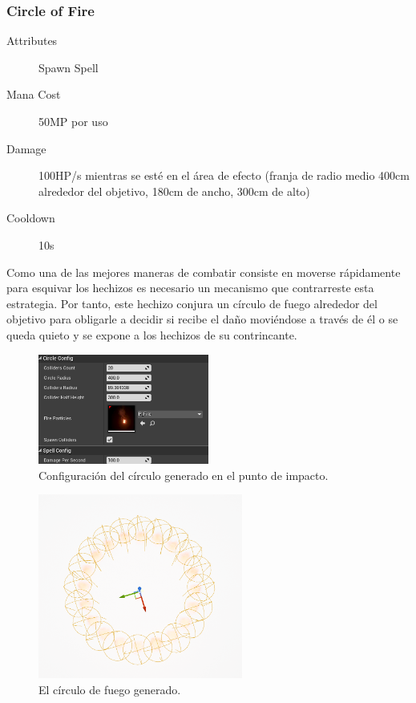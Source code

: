 \documentclass[12pt]{report}
\begin{document}
\newpage
\subsubsection{Circle of Fire}

\begin{description}
	\item[Attributes] Spawn Spell
	\item[Mana Cost] 50MP por uso
	\item[Damage] 100HP/s mientras se esté en el área de efecto (franja de radio medio 400cm alrededor del objetivo, 180cm de ancho, 300cm de alto)
	\item[Cooldown] 10s
\end{description}

Como una de las mejores maneras de combatir consiste en moverse rápidamente para esquivar los hechizos es necesario un mecanismo que contrarreste esta estrategia. Por tanto, este hechizo conjura un círculo de fuego alrededor del objetivo para obligarle a decidir si recibe el daño moviéndose a través de él o se queda quieto y se expone a los hechizos de su contrincante.

\begin{figure}[H]
    \centering
    \includegraphics[width=0.5\textwidth]{circle_of_fire_config}
	\captionsetup{labelformat=empty}
    \caption{Configuración del círculo generado en el punto de impacto.}
\end{figure}

\begin{figure}[H]
    \centering
    \includegraphics[width=0.6\textwidth]{circle_of_fire_procedural}
	\captionsetup{labelformat=empty}
    \caption{El círculo de fuego generado.}
\end{figure}
\end{document}
